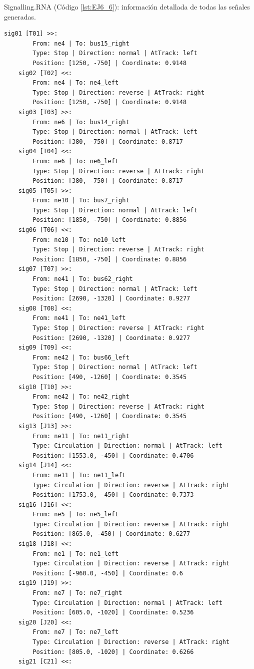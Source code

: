 	Signalling.RNA (Código \ref{lst:EJ6_6}): información detallada de todas las señales generadas.
	
	\begin{lstlisting}[language = {}, caption = Signalling.RNA, label = {lst:EJ6_6}]
	sig01 [T01] >>:
		From: ne4 | To: bus15_right
		Type: Stop | Direction: normal | AtTrack: left 
		Position: [1250, -750] | Coordinate: 0.9148
	sig02 [T02] <<:
		From: ne4 | To: ne4_left
		Type: Stop | Direction: reverse | AtTrack: right 
		Position: [1250, -750] | Coordinate: 0.9148
	sig03 [T03] >>:
		From: ne6 | To: bus14_right
		Type: Stop | Direction: normal | AtTrack: left 
		Position: [380, -750] | Coordinate: 0.8717
	sig04 [T04] <<:
		From: ne6 | To: ne6_left
		Type: Stop | Direction: reverse | AtTrack: right 
		Position: [380, -750] | Coordinate: 0.8717
	sig05 [T05] >>:
		From: ne10 | To: bus7_right
		Type: Stop | Direction: normal | AtTrack: left 
		Position: [1850, -750] | Coordinate: 0.8856
	sig06 [T06] <<:
		From: ne10 | To: ne10_left
		Type: Stop | Direction: reverse | AtTrack: right 
		Position: [1850, -750] | Coordinate: 0.8856
	sig07 [T07] >>:
		From: ne41 | To: bus62_right
		Type: Stop | Direction: normal | AtTrack: left 
		Position: [2690, -1320] | Coordinate: 0.9277
	sig08 [T08] <<:
		From: ne41 | To: ne41_left
		Type: Stop | Direction: reverse | AtTrack: right 
		Position: [2690, -1320] | Coordinate: 0.9277
	sig09 [T09] <<:
		From: ne42 | To: bus66_left
		Type: Stop | Direction: normal | AtTrack: left 
		Position: [490, -1260] | Coordinate: 0.3545
	sig10 [T10] >>:
		From: ne42 | To: ne42_right
		Type: Stop | Direction: reverse | AtTrack: right 
		Position: [490, -1260] | Coordinate: 0.3545
	sig13 [J13] >>:
		From: ne11 | To: ne11_right
		Type: Circulation | Direction: normal | AtTrack: left 
		Position: [1553.0, -450] | Coordinate: 0.4706
	sig14 [J14] <<:
		From: ne11 | To: ne11_left
		Type: Circulation | Direction: reverse | AtTrack: right 
		Position: [1753.0, -450] | Coordinate: 0.7373
	sig16 [J16] <<:
		From: ne5 | To: ne5_left
		Type: Circulation | Direction: reverse | AtTrack: right 
		Position: [865.0, -450] | Coordinate: 0.6277
	sig18 [J18] <<:
		From: ne1 | To: ne1_left
		Type: Circulation | Direction: reverse | AtTrack: right 
		Position: [-960.0, -450] | Coordinate: 0.6
	sig19 [J19] >>:
		From: ne7 | To: ne7_right
		Type: Circulation | Direction: normal | AtTrack: left 
		Position: [605.0, -1020] | Coordinate: 0.5236
	sig20 [J20] <<:
		From: ne7 | To: ne7_left
		Type: Circulation | Direction: reverse | AtTrack: right 
		Position: [805.0, -1020] | Coordinate: 0.6266
	sig21 [C21] <<:

\end{lstlisting}
